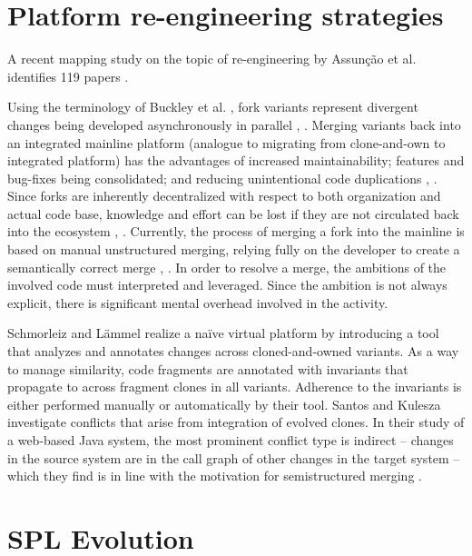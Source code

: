 \section{Platform re-engineering strategies}
A recent mapping study on the topic of re-engineering by Assun{\c{c}}{\~a}o et al. identifies 119 papers \cite{assuncao2017mapping}.

Using the terminology of Buckley et al. \cite{buckley2005}, fork variants represent divergent changes being developed asynchronously in parallel \cite{mens2002}, \cite{stanciulescu2015}. Merging variants back into an integrated mainline platform (analogue to migrating from clone-and-own to integrated platform) has the advantages of increased maintainability; features and bug-fixes being consolidated; and reducing unintentional code duplications \cite{schmorleiz2016similarity}, \cite{stanciulescu2015}. Since forks are inherently decentralized with respect to both organization and actual code base, knowledge and effort can be lost if they are not circulated back into the ecosystem \cite{stanciulescu2015}, \cite{gousios2015}. Currently, the process of merging a fork into the mainline is based on manual unstructured merging, relying fully on the developer to create a semantically correct merge \cite{mens2002}, \cite{apel2011}. In order to resolve a merge, the ambitions of the involved code must interpreted and leveraged. Since the ambition is not always explicit, there is significant mental overhead involved in the activity.

Schmorleiz and Lämmel \cite{schmorleiz2016similarity} realize a naïve virtual platform by introducing a tool that analyzes and annotates changes across cloned-and-owned variants. As a way to manage similarity, code fragments are annotated with invariants that propagate to across fragment clones in all variants. Adherence to the invariants is either performed manually or automatically by their tool. Santos and Kulesza \cite{santos} investigate conflicts that arise from integration of evolved clones. In their study of a web-based Java system, the most prominent conflict type is indirect -- changes in the source system are in the call graph of other changes in the target system -- which they find is in line with the motivation for semistructured merging \cite{apel2011}.

\section{SPL Evolution}
\cite{neves2011evolution} \cite{passos2016coevolution}

